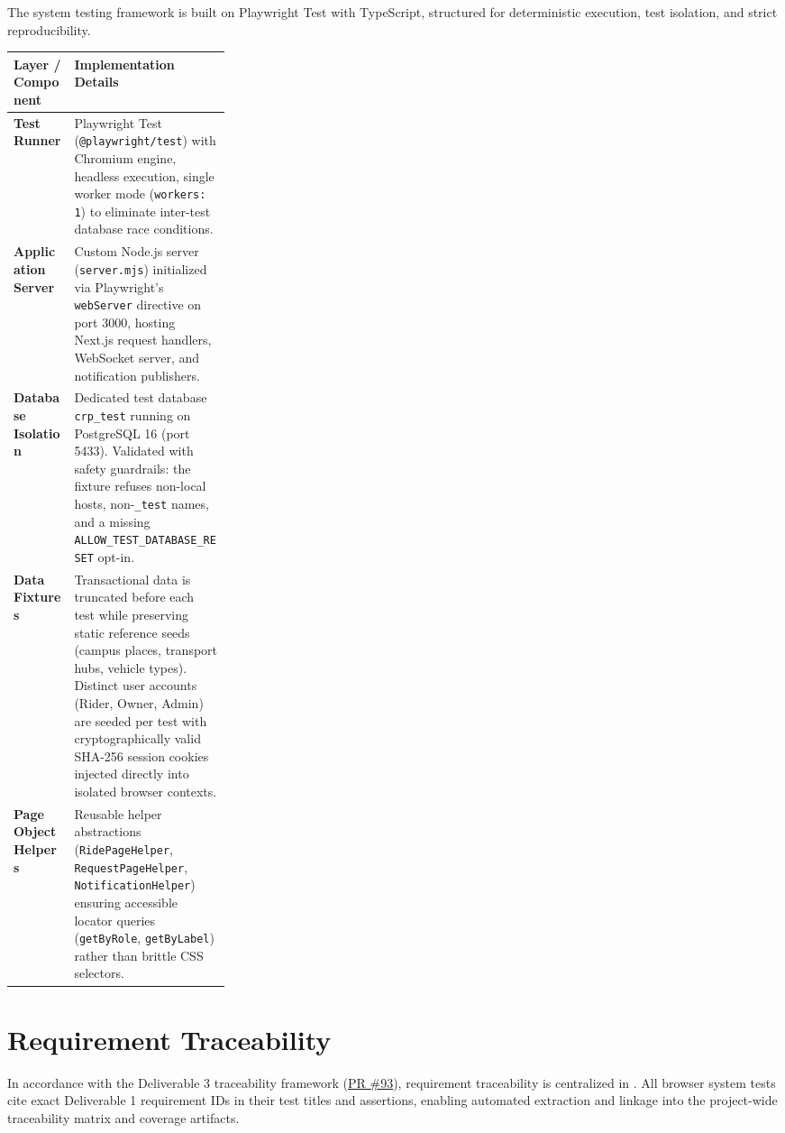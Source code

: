 \documentclass[10pt]{article}
\begin{document}
The system testing framework is built on Playwright Test with TypeScript, structured for deterministic execution, test isolation, and strict reproducibility.

\begin{tabularx}{\linewidth}{@{}>{\raggedright\arraybackslash}p{0.28\linewidth}X@{}}
\toprule
\textbf{Layer / Component} & \textbf{Implementation Details} \\
\midrule
\textbf{Test Runner} & Playwright Test (\texttt{@playwright/test}) with Chromium engine, headless execution, single worker mode (\texttt{workers: 1}) to eliminate inter-test database race conditions. \\
\textbf{Application Server} & Custom Node.js server (\texttt{server.mjs}) initialized via Playwright's \texttt{webServer} directive on port 3000, hosting Next.js request handlers, WebSocket server, and notification publishers. \\
\textbf{Database Isolation} & Dedicated test database \texttt{crp\_test} running on PostgreSQL 16 (port 5433). Validated with safety guardrails: the fixture refuses non-local hosts, non-\texttt{\_test} names, and a missing \texttt{ALLOW\_TEST\_DATABASE\_RESET} opt-in. \\
\textbf{Data Fixtures} & Transactional data is truncated before each test while preserving static reference seeds (campus places, transport hubs, vehicle types). Distinct user accounts (Rider, Owner, Admin) are seeded per test with cryptographically valid SHA-256 session cookies injected directly into isolated browser contexts. \\
\textbf{Page Object Helpers} & Reusable helper abstractions (\texttt{RidePageHelper}, \texttt{RequestPageHelper}, \texttt{NotificationHelper}) ensuring accessible locator queries (\texttt{getByRole}, \texttt{getByLabel}) rather than brittle CSS selectors. \\
\bottomrule
\end{tabularx}

\section{Requirement Traceability}

In accordance with the Deliverable 3 traceability framework (\href{https://github.com/CS455-Carpooling/Campus_Ridepooling_Automation/pull/93}{PR \#93}), requirement traceability is centralized in . All browser system tests cite exact Deliverable 1 requirement IDs in their test titles and assertions, enabling automated extraction and linkage into the project-wide traceability matrix and coverage artifacts.
\end{document}
